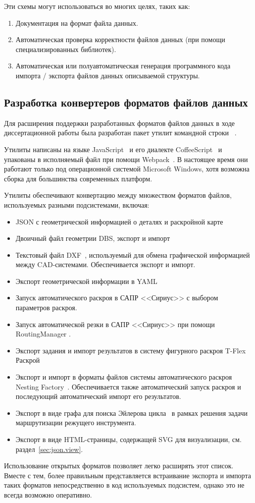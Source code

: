 Эти схемы могут использоваться во многих целях, таких как:

\begin{enumerate}
  \item Документация на формат файла данных.
  \item Автоматическая проверка корректности файлов данных
  (при помощи специализированных библиотек).
  \item Автоматическая или полуавтоматическая генерация
  программного кода импорта / экспорта файлов данных
  описываемой структуры.
\end{enumerate}

\subsection{Разработка конвертеров форматов файлов данных}
\label{sec:json-dbs.js}

Для расширения поддержки разработанных форматов файлов данных
в ходе диссертационной работы
была разработан пакет утилит командной строки~
\cite{bi:dbs2json}.

Утилиты написаны на языке
JavaScript~\cite{bi:JavaScript}
и его диалекте
CoffeeScript~\cite{bi:CoffeeScript}
и упакованы в исполняемый файл при помощи
Webpack~\cite{bi:webpack}.
В настоящее время они работают только под
операционной системой Microsoft Windows,
хотя возможна сборка для большинства современных платформ.

Утилиты обеспечивают конвертацию между множеством
форматов файлов,
используемых разными подсистемами,
включая:
\begin{itemize}
  \item JSON с геометрической информацией о деталях и раскройной карте
  \item Двоичный файл геометрии DBS, экспорт и импорт
  \item Текстовый файл DXF~\cite{bi:DXF},
  используемый для обмена графической информацией между CAD-системами.
  Обеспечивается экспорт и импорт.
  \item Экспорт геометрической информации в YAML~\cite{bi:YAML}
  \item Запуск автоматического раскроя в САПР <<Сириус>>
  с выбором параметров раскроя.
  \item Запуск автоматической резки в САПР <<Сириус>>
  при помощи RoutingManager
  \cite{bi:greedy,bi:RoMa}.
  \item Экспорт задания и импорт результатов
  в систему фигурного раскроя T-Flex Раскрой~\cite{bi:T-Flex}
  \item Экспорт и импорт в форматы файлов системы автоматического раскроя
  Nesting Factory~\cite{bi:Algomate}.
  Обеспечивается также автоматический запуск раскроя
  и последующий автоматический импорт его результатов.
  \item Экспорт в виде графа для поиска
  Эйлерова цикла~\cite{bi:Makarovskikh2019Jan,Makarovskikh20181171,bi:Makarovskikh2019Other}
  в рамках решения задачи маршрутизации режущего инструмента.
  \item Экспорт в виде HTML-страницы,
  содержащей SVG
  для визуализации,
  см. раздел~\ref{sec:json.view}.
\end{itemize}

Использование открытых форматов позволяет
легко расширять этот список.
Вместе с тем,
более правильным представляется
встраивание экспорта и импорта таких форматов
непосредственно в код используемых подсистем,
однако это не всегда возможно оперативно.
